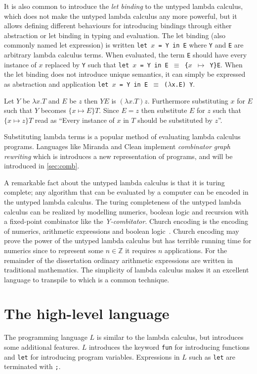 It is also common to introduce the \textit{let binding} to the untyped lambda calculus, which does not make the untyped lambda calculus any more powerful, but it allows defining different behaviours for introducing bindings through either abstraction or let binding in typing and evaluation.
The let binding (also commonly named let expression) is written \texttt{let $x$ = Y in E} where \texttt{Y} and \texttt{E} are arbitrary lambda calculus terms.
When evaluated, the term \texttt{E} should have every instance of $x$ replaced by \texttt{Y} such that \texttt{let $x$ = Y in E $\equiv$ \{$x$ $\mapsto$ Y\}E}.
When the let binding does not introduce unique semantics, it can simply be expressed as abstraction and application \texttt{let $x$ = Y in E $\equiv$ ($\lambda$x.E) Y}.

\begin{exmp}
\label{ex:application}
Let $Y$ be $\lambda x . T$ and $E$ be $z$ then $Y E$ is $(\lambda x . T) z$.
Furthermore substituting $x$ for $E$ such that $Y$ becomes $\{x \mapsto E\}T$.
Since $E = z$ then substitute $E$ for $z$ such that $\{x \mapsto z\}T$ read as ``Every instance of $x$ in $T$ should be substituted by $z$''.
\end{exmp}
\begin{remark}
Substituting lambda terms is a popular method of evaluating lambda calculus programs.
Languages like Miranda and Clean implement \textit{combinator graph rewriting} which is introduces a new representation of programs, and will be introduced in \autoref{sec:comb}.
\end{remark}

A remarkable fact about the untyped lambda calculus is that it is turing complete; any algorithm that can be evaluated by a computer can be encoded in the untyped lambda calculus.
The turing completeness of the untyped lambda calculus can be realized by modelling numerics, boolean logic and recursion with a fixed-point combinator like the \textit{Y-combitator}.
Church encoding is the encoding of numerics, arithmetic expressions and boolean logic~\cite{church1985calculi}.
Church encoding may prove the power of the untyped lambda calculus but has terrible running time for numerics since to represent some $n \in \mathbb{Z}$ it requires $n$ applications.
For the remainder of the dissertation ordinary arithmetic expressions are written in traditional mathematics.
The simplicity of lambda calculus makes it an excellent language to transpile to which is a common technique.

\section{The high-level language}
The programming language $L$ is similar to the lambda calculus, but introduces some additional features.
$L$ introduces the keyword \texttt{fun} for introducing functions and \texttt{let} for introducing program variables.
Expressions in $L$ such as \texttt{let} are terminated with \texttt{;}.

